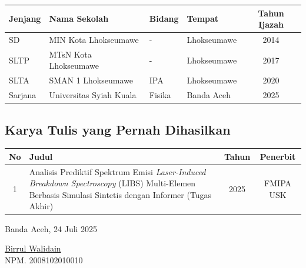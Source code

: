 \begin{center}
\begin{tabular}{| l | p{4cm} | p{1.2cm} | p{3cm} | c |}
    \hline
    \textbf{Jenjang} & \textbf{Nama Sekolah} & \textbf{Bidang} & \textbf{Tempat} & \textbf{Tahun Ijazah} \\
    \hline
    SD & MIN Kota Lhokseumawe & - & Lhokseumawe & 2014 \\
    \hline
    SLTP & MTsN Kota Lhokseumawe & - & Lhokseumawe & 2017 \\
    \hline
    SLTA & SMAN 1 Lhokseumawe & IPA & Lhokseumawe & 2020 \\
    \hline
    Sarjana & Universitas Syiah Kuala & Fisika & Banda Aceh & 2025 \\
    \hline
\end{tabular}
\end{center}


\subsection*{Karya Tulis yang Pernah Dihasilkan}
\begin{center}
\begin{tabular}{| c | p{8cm} | c | c |}
    \hline
    \textbf{No} & \textbf{Judul} & \textbf{Tahun} & \textbf{Penerbit} \\
    \hline
    1 & Analisis Prediktif Spektrum Emisi \textit{Laser-Induced Breakdown Spectroscopy} (LIBS) Multi-Elemen Berbasis Simulasi Sintetis dengan Informer (Tugas Akhir) & 2025 & FMIPA USK  \\
    \hline
\end{tabular}
\end{center}

\vspace{0.9cm} %

\begin{flushright}
    Banda Aceh, 24 Juli 2025 \\ %
    \vspace{4em} %
    
    \underline{Birrul Walidain} \\
    \vspace{-0.14cm}
    NPM. 2008102010010
\end{flushright}

